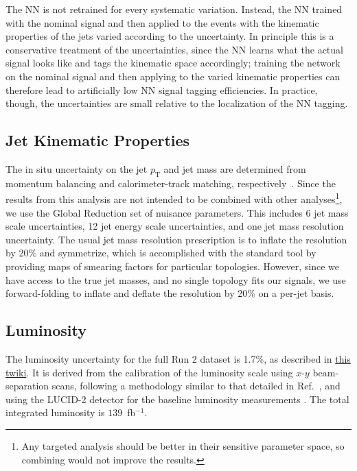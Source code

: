The NN is not retrained for every systematic variation.
Instead, the NN trained with the nominal signal and then applied to the events with the kinematic properties of the jets varied according to the uncertainty.
In principle this is a conservative treatment of the uncertainties, since the NN learns what the actual signal looks like and tags the kinematic space accordingly;
training the network on the nominal signal and then applying to the varied kinematic properties can therefore lead to artificially low NN signal tagging efficiencies.
In practice, though, the uncertainties are small relative to the localization of the NN tagging.

\subsection{Jet Kinematic Properties}
The in situ uncertainty on the jet $p_\text{T}$ and jet mass are determined from momentum balancing and calorimeter-track matching, respectively~\cite{Aaboud:2018kfi}.
Since the results from this analysis are not intended to be combined with other analyses\footnote{Any targeted analysis should be better in their sensitive parameter space, so combining would not improve the results.}, we use the Global Reduction set of nuisance parameters.
This includes 6 jet mass scale uncertainties, 12 jet energy scale uncertainties, and one jet mass resolution uncertainty.
The usual jet mass resolution prescription is to inflate the resolution by 20\% and symmetrize, which is accomplished with the standard tool by providing maps of smearing factors for particular topologies.
However, since we have access to the true jet masses, and no single topology fits our signals, we use forward-folding to inflate and deflate the resolution by 20\% on a per-jet basis. 

\subsection{Luminosity}

The luminosity uncertainty for the full Run 2 dataset is 1.7\%, as described in \href{https://twiki.cern.ch/twiki/bin/viewauth/Atlas/LuminosityForPhysics#2018_13_TeV_proton_proton_Morion}{this twiki}.   It is derived from the calibration of the luminosity scale using $x$-$y$ beam-separation scans, following a methodology similar to that detailed in Ref.~\cite{DAPR-2013-01}, and using the LUCID-2 detector for the baseline luminosity measurements \cite{LUCID2}.  The total integrated luminosity is $139$~fb$^{-1}$.

